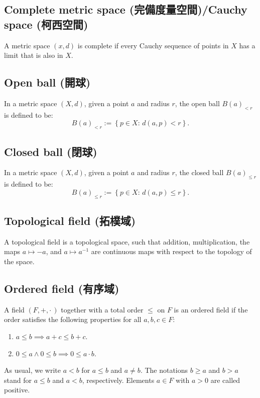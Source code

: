 \documentclass[a4paper,12pt]{article}
\begin{document}
\subsection{Complete metric space (完備度量空間)/Cauchy space (柯西空間)}
A metric space $(x,d)$ is complete if every Cauchy sequence of points in $X$ has a limit that is also in $X$.
\subsection{Open ball (開球)}
In a metric space $(X,d)$, given a point $a$ and radius $r$, the open ball $B(a)_{<r}$ is defined to be:
\[B(a)_{<r}:=\left\{p\in X:\, d(a,p)<r\right\}.\]
\subsection{Closed ball (閉球)}
In a metric space $(X,d)$, given a point $a$ and radius $r$, the closed ball $B(a)_{\leq r}$ is defined to be:
\[B(a)_{\leq r}:=\left\{p\in X:\, d(a,p)\leq r\right\}.\]
\subsection{Topological field (拓樸域)}
A topological field is a topological space, such that addition, multiplication, the maps $a\mapsto -a$, and $a\mapsto a^{-1}$ are continuous maps with respect to the topology of the space.
\subsection{Ordered field (有序域)}
A field $(F,+,\cdot\,)$ together with a total order $\leq$ on $F$ is an ordered field if the order satisfies the following properties for all $a,b,c\in F$:
\begin{enumerate}
\item $a\leq b\implies a+c\leq b+c$.
\item $0\leq a\land 0\leq b\implies 0\leq a\cdot b$.
\end{enumerate}
As usual, we write $a<b$ for $a\leq b$ and $a\neq b$. The notations $b\geq a$ and $b>a$ stand for $a\leq b$ and $a<b$, respectively. Elements $a\in F$ with $a>0$ are called positive.
\end{document}
